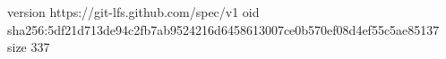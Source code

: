 version https://git-lfs.github.com/spec/v1
oid sha256:5df21d713de94c2fb7ab9524216d6458613007ce0b570ef08d4ef55c5ae85137
size 337

